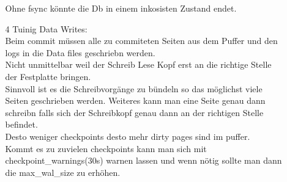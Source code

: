 \documentclass[12pt]{article}\pagestyle{myheadings}
\theoremstyle{plain}
\begin{document}
\begin{enumerate}
\begin{itemize}
Ohne fsync könnte die Db in einem inkosisten Zustand endet.\\
\item[4] Tuinig Data Writes: \\
Beim commit müssen alle zu commiteten Seiten aus dem Puffer und den logs in die Data files geschriebn werden.\\
Nicht unmittelbar weil der Schreib Lese Kopf erst an die richtige Stelle der Festplatte bringen.\\
Sinnvoll ist es die Schreibvorgänge zu bündeln so das möglichst viele Seiten geschrieben werden. Weiteres kann man eine Seite genau dann schreibn falls sich der Schreibkopf genau dann an der richtigen Stelle befindet.\\
Desto weniger checkpoints desto mehr dirty pages sind im puffer.\\
Kommt es zu zuvielen checkpoints kann man sich mit checkpoint\_warnings(30s) warnen lassen und wenn nötig sollte man dann die max\_wal\_size zu erhöhen.\\


\end{itemize}
\end{enumerate}
\end{document}
